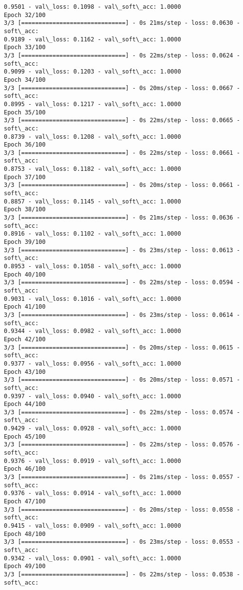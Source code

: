 \documentclass[11pt]{article}
\begin{document}
\begin{Verbatim}[commandchars=\\\{\}]
0.9501 - val\_loss: 0.1098 - val\_soft\_acc: 1.0000
Epoch 32/100
3/3 [==============================] - 0s 21ms/step - loss: 0.0630 - soft\_acc:
0.9189 - val\_loss: 0.1162 - val\_soft\_acc: 1.0000
Epoch 33/100
3/3 [==============================] - 0s 22ms/step - loss: 0.0624 - soft\_acc:
0.9099 - val\_loss: 0.1203 - val\_soft\_acc: 1.0000
Epoch 34/100
3/3 [==============================] - 0s 20ms/step - loss: 0.0667 - soft\_acc:
0.8995 - val\_loss: 0.1217 - val\_soft\_acc: 1.0000
Epoch 35/100
3/3 [==============================] - 0s 22ms/step - loss: 0.0665 - soft\_acc:
0.8739 - val\_loss: 0.1208 - val\_soft\_acc: 1.0000
Epoch 36/100
3/3 [==============================] - 0s 22ms/step - loss: 0.0661 - soft\_acc:
0.8753 - val\_loss: 0.1182 - val\_soft\_acc: 1.0000
Epoch 37/100
3/3 [==============================] - 0s 20ms/step - loss: 0.0661 - soft\_acc:
0.8857 - val\_loss: 0.1145 - val\_soft\_acc: 1.0000
Epoch 38/100
3/3 [==============================] - 0s 21ms/step - loss: 0.0636 - soft\_acc:
0.8916 - val\_loss: 0.1102 - val\_soft\_acc: 1.0000
Epoch 39/100
3/3 [==============================] - 0s 23ms/step - loss: 0.0613 - soft\_acc:
0.8953 - val\_loss: 0.1058 - val\_soft\_acc: 1.0000
Epoch 40/100
3/3 [==============================] - 0s 22ms/step - loss: 0.0594 - soft\_acc:
0.9031 - val\_loss: 0.1016 - val\_soft\_acc: 1.0000
Epoch 41/100
3/3 [==============================] - 0s 23ms/step - loss: 0.0614 - soft\_acc:
0.9344 - val\_loss: 0.0982 - val\_soft\_acc: 1.0000
Epoch 42/100
3/3 [==============================] - 0s 20ms/step - loss: 0.0615 - soft\_acc:
0.9377 - val\_loss: 0.0956 - val\_soft\_acc: 1.0000
Epoch 43/100
3/3 [==============================] - 0s 20ms/step - loss: 0.0571 - soft\_acc:
0.9397 - val\_loss: 0.0940 - val\_soft\_acc: 1.0000
Epoch 44/100
3/3 [==============================] - 0s 22ms/step - loss: 0.0574 - soft\_acc:
0.9429 - val\_loss: 0.0928 - val\_soft\_acc: 1.0000
Epoch 45/100
3/3 [==============================] - 0s 22ms/step - loss: 0.0576 - soft\_acc:
0.9376 - val\_loss: 0.0919 - val\_soft\_acc: 1.0000
Epoch 46/100
3/3 [==============================] - 0s 21ms/step - loss: 0.0557 - soft\_acc:
0.9376 - val\_loss: 0.0914 - val\_soft\_acc: 1.0000
Epoch 47/100
3/3 [==============================] - 0s 20ms/step - loss: 0.0558 - soft\_acc:
0.9415 - val\_loss: 0.0909 - val\_soft\_acc: 1.0000
Epoch 48/100
3/3 [==============================] - 0s 23ms/step - loss: 0.0553 - soft\_acc:
0.9342 - val\_loss: 0.0901 - val\_soft\_acc: 1.0000
Epoch 49/100
3/3 [==============================] - 0s 22ms/step - loss: 0.0538 - soft\_acc:

\end{Verbatim}
\end{document}
